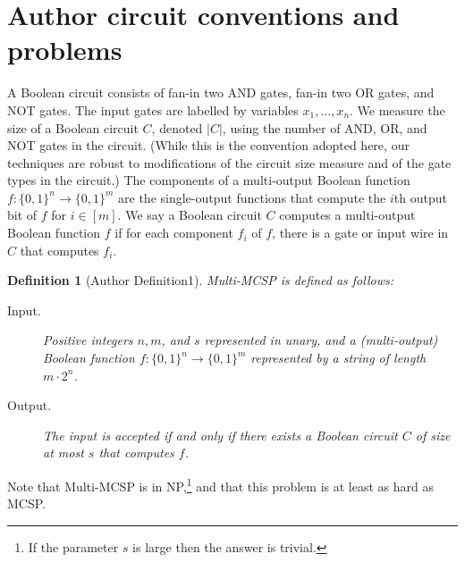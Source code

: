 \documentclass[10pt,a4paper]{article}
\newtheorem{ntdefinition}[nttheorem]{Definition}
\begin{document}
\section*{Author circuit conventions and problems}
A Boolean circuit consists of fan-in two AND gates, fan-in two OR gates, and NOT gates. The input gates are labelled by variables $x_1,\ldots,x_n$. We measure the size of a Boolean circuit $C$, denoted $|C|$, using the number of AND, OR, and NOT gates in the circuit. (While this is the convention adopted here, our techniques are robust to modifications of the circuit size measure and of the gate types in the circuit.)
The components of a multi-output Boolean function $f:\{0,1\}^n\to\{0,1\}^m$ are the single-output functions that compute the $i$th output bit of $f$ for $i\in[m]$. We say a Boolean circuit $C$ computes a multi-output Boolean function $f$ if for each component $f_i$ of $f$, there is a gate or input wire in $C$ that computes $f_i$.
\setcounter{nttheorem}{0}
\begin{ntdefinition}[Author Definition1]
Multi-MCSP is defined as follows:
\begin{description}
\item[Input.] Positive integers $n,m$, and $s$ represented in unary, and a (multi-output) Boolean function $f:\{0,1\}^n\to\{0,1\}^m$ represented by a string of length $m\cdot2^n$.
\item[Output.] The input is accepted if and only if there exists a Boolean circuit $C$ of size at most $s$ that computes $f$.
\end{description}
\end{ntdefinition}
Note that Multi-MCSP is in NP,\footnote{If the parameter $s$ is large then the answer is trivial.} and that this problem is at least as hard as MCSP.
\end{document}
